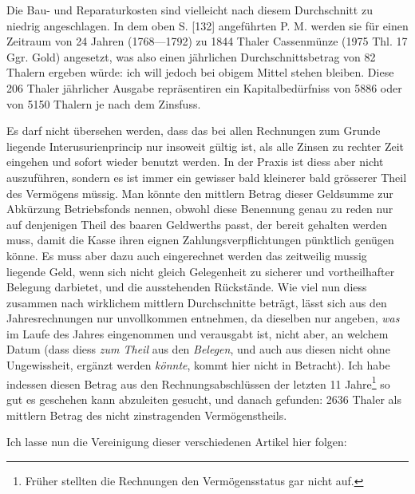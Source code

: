 \noindent\hspace*{\parindent}Die Bau- und Reparaturkosten sind vielleicht nach diesem Durchschnitt zu niedrig angeschlagen. In dem oben S. [132] angeführten P. M. werden sie für einen Zeitraum von 24 Jahren (1768—1792) zu 1844 Thaler Cassenmünze (1975 Thl. 17 Ggr. Gold) angesetzt, was also einen jährlichen Durchschnittsbetrag von 82 Thalern ergeben würde: ich will jedoch bei obigem Mittel stehen bleiben. Diese 206 Thaler jährlicher Ausgabe repräsentiren ein Kapitalbedürfniss von 5886 oder von 5150 Thalern je nach dem Zinsfuss.

Es darf nicht übersehen werden, dass das bei allen Rechnungen zum Grunde liegende Interusurienprincip nur insoweit gültig ist, als alle Zinsen zu rechter Zeit eingehen und sofort wieder benutzt werden. In der Praxis ist diess aber nicht auszuführen, sondern es ist immer ein gewisser bald kleinerer bald grösserer Theil des Vermögens müssig. Man könnte den mittlern Betrag dieser Geldsumme zur Abkürzung Betriebsfonds nennen, obwohl diese Benennung genau zu reden nur auf denjenigen Theil des baaren Geldwerths passt, der bereit gehalten werden muss, damit die Kasse ihren eignen Zahlungsverpflichtungen pünktlich genügen könne. Es muss aber dazu auch eingerechnet werden das zeitweilig mussig liegende Geld, wenn sich nicht gleich Gelegenheit zu sicherer und vortheilhafter Belegung darbietet, und die ausstehenden Rückstände. Wie viel nun diess zusammen nach wirklichem mittlern Durchschnitte beträgt, lässt sich aus den Jahresrechnungen nur unvollkommen entnehmen, da dieselben nur angeben, \textit{was} im Laufe des Jahres eingenommen und verausgabt ist, nicht aber, an welchem Datum (dass diess \textit{zum Theil} aus den \textit{Belegen}, und auch aus diesen nicht ohne Ungewissheit, ergänzt werden \textit{könnte}, kommt hier nicht in Betracht). Ich habe indessen diesen Betrag aus den Rechnungsabschlüssen der letzten 11 Jahre\footnote{Früher stellten die Rechnungen den Vermögensstatus gar nicht auf.} so gut es geschehen kann abzuleiten gesucht, und danach gefunden: 2636 Thaler als mittlern Betrag des nicht zinstragenden Vermögenstheils.

Ich lasse nun die Vereinigung dieser verschiedenen Artikel hier folgen:
